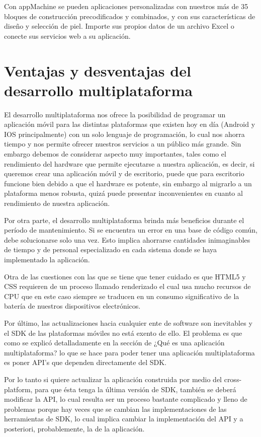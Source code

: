 \documentclass[a4paper,12pt]{mylib/publicacion}
\begin{document}
Con appMachine se pueden aplicaciones personalizadas con nuestros más de 35 bloques de construcción precodificados y combinados, y con sus características de diseño y selección de piel.
Importe sus propios datos de un archivo Excel o conecte sus servicios web a su aplicación.


\section{Ventajas y desventajas del desarrollo multiplataforma}

El desarrollo multiplataforma nos ofrece la posibilidad de programar un aplicación móvil para las distintas plataformas que existen hoy en día (Android y IOS principalmente) con un solo lenguaje de programación, lo cual nos ahorra tiempo y nos permite ofrecer nuestros servicios a un público más grande. Sin embargo debemos de considerar aspecto muy
importantes, tales como el rendimiento del hardware que permite ejecutarse a nuestra aplicación, es decir, si queremos crear una aplicación móvil y de escritorio, puede que para escritorio funcione bien debido a que el hardware es potente, sin embargo al migrarlo a un plataforma menos robusta, quizá puede presentar inconvenientes en cuanto al rendimiento de
nuestra aplicación.

Por otra parte, el desarrollo multiplataforma brinda más beneficios durante el período de mantenimiento. Si se encuentra un error en una base de código común, debe solucionarse solo una vez. Esto implica ahorrarse cantidades inimaginables de tiempo y de personal especializado en cada sistema donde se haya implementado la aplicación.

Otra de las cuestiones con las que se tiene que tener cuidado es que HTML5 y CSS requieren de un proceso llamado renderizado el cual usa mucho recursos de CPU que en este caso siempre se traducen en un consumo significativo de la batería de nuestros dispositivos electrónicos.

Por último, las actualizaciones hacia cualquier ente de software son inevitables y el SDK de las plataformas móviles no está exento de ello. El problema es que como se explicó detalladamente en la sección de ¿Qué es una aplicación multiplataforma? lo que se hace para poder tener una aplicación multiplataforma es poner API’s que dependen directamente
del SDK.

Por lo tanto si quiere actualizar la aplicación construida por medio del cross-platform, para que ésta tenga la última versión de SDK, también se deberá modificar la API, lo cual resulta ser un proceso bastante complicado y lleno de problemas porque hay veces que se cambian las implementaciones de las herramientas de SDK, lo cual implica cambiar la implementación del API y a posteriori, probablemente, la de la aplicación.
\end{document}
